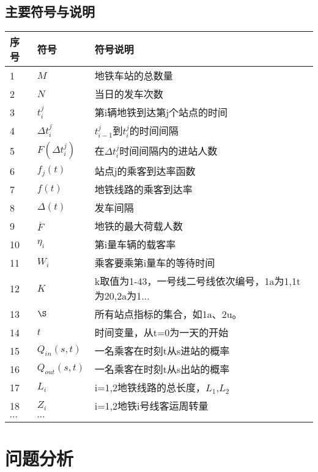 \documentclass[12pt,a4paper]{mcmthesis}
\newcommand{\headcol}{\rowcolor{tableheadcolor}}
\begin{document}
\subsection{主要符号与说明}

\begin{table}[h!]
	\centering
	\small
	\begin{tabular}{p{60pt}<{\centering}|p{60pt}<{\centering}p{180pt}<{\raggedright}}
		\hline
		\headcol 序号 & 符号 & 符号说明 \\
		\hline
		1 & $M$ & 地铁车站的总数量 \\
		2 & $N$ & 当日的发车次数\\
		3 & $t_{i}^{j}$ & 第i辆地铁到达第j个站点的时间\\
		4 & $\Delta {t_i^j}$ & $t_{i-1}^{j}$到$t_i^j$的时间间隔\\
		5 & $F(\Delta {t_i^j})$ & 在$\Delta t_i^j$时间间隔内的进站人数\\
		6 & $f_j(t)$ & 站点j的乘客到达率函数 \\
		7 & ${f(t)}$ & 地铁线路的乘客到达率\\
		8 & $\Delta(t)$ & 发车间隔 \\
		9 & $\overline{F}$ & 地铁的最大荷载人数 \\
		10 & $\eta_i$ & 第i量车辆的载客率\\
		11 & $W_i$ & 乘客要乘第i量车的等待时间 \\
		12 & $K$ & k取值为1-43，一号线二号线依次编号，1a为1,1t为20,2a为1... \\
		13 & $\S$ & 所有站点指标的集合，如1a、2u。 \\
		14 & $t$ &时间变量，从t=0为一天的开始\\
		15 &$Q_{in}(s,t)$&一名乘客在时刻t从s进站的概率\\
		16 &$Q_{out}(s,t)$&一名乘客在时刻t从s出站的概率\\
		17 &$L_i$& i={1,2}地铁线路的总长度，$L_1$,$L_2$\\		
		18 &$Z_i$& i={1,2}地铁i号线客运周转量\\
		$\cdots$ & $\cdots$ \\
		\hline
	\end{tabular}
	\label{symbol}
\end{table}



\section{问题分析}
\end{document}
